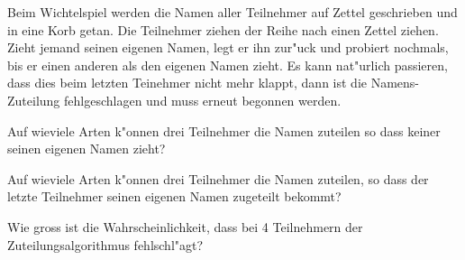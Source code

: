 Beim Wichtelspiel werden die Namen aller Teilnehmer auf Zettel geschrieben
und in eine Korb getan.
Die Teilnehmer ziehen der Reihe nach einen Zettel ziehen.
Zieht jemand seinen eigenen Namen, legt er ihn zur"uck und probiert
nochmals, bis er einen anderen als den eigenen Namen zieht.
Es kann nat"urlich passieren, dass dies beim letzten Teinehmer
nicht mehr klappt, dann ist die Namens-Zuteilung fehlgeschlagen und
muss erneut begonnen werden.

\begin{teilaufgaben}
\item Auf wieviele Arten k"onnen drei Teilnehmer die Namen zuteilen
so dass keiner seinen eigenen Namen zieht?
\item Auf wieviele Arten k"onnen drei Teilnehmer die Namen zuteilen,
so dass der letzte Teilnehmer seinen eigenen Namen zugeteilt bekommt?
\item 
\item Wie gross ist die Wahrscheinlichkeit, dass bei 4 Teilnehmern
der Zuteilungsalgorithmus fehlschl"agt?
\end{teilaufgaben}

